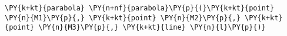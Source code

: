 \begin{Verbatim}[commandchars=\\\{\}]
    \PY{k+kt}{parabola} \PY{n+nf}{parabola}\PY{p}{(}\PY{k+kt}{point} \PY{n}{M1}\PY{p}{,} \PY{k+kt}{point} \PY{n}{M2}\PY{p}{,} \PY{k+kt}{point} \PY{n}{M3}\PY{p}{,} \PY{k+kt}{line} \PY{n}{l}\PY{p}{)}
\end{Verbatim}
